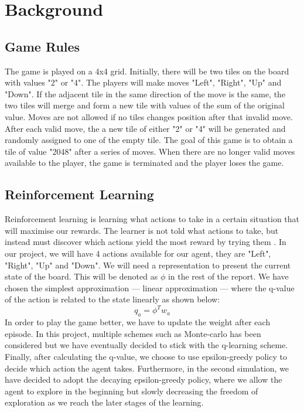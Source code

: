 \section{Background}
\subsection{Game Rules}
The game is played on a 4x4 grid. Initially, there will be two tiles on the board with values "2" or "4".  The players will make moves "Left", "Right", "Up" and "Down". If the adjacent tile in the same direction of the move is the same, the two tiles will merge and form a new tile with values of the sum of the original value. Moves are not allowed if no tiles changes position after that invalid move. After each valid move, the a new tile of either "2" or "4" will be generated and randomly assigned to one of the empty tile. The goal of this game is to obtain a tile of value "2048" after a series of moves. When there are no longer valid moves available to the player, the game is terminated and the player loses the game.

\subsection{Reinforcement Learning}
Reinforcement learning is learning what actions to take in a certain situation  that will maximise our rewards. The learner is not told what actions to take, but instead must discover which actions yield the most reward by trying them \cite{sutton2018reinforcement}.  In our project, we will have 4 actions available for our agent, they are "Left", "Right", "Up" and "Down".  We will need a representation to present the current state of the board. This will be denoted as $\phi$ in the rest of the report. We have chosen the simplest approximation --- linear approximation --- where the q-value of the action  is related to the state linearly as shown below:
\begin{equation*}
q_{a} = \phi ^{T} w_{a}
\end{equation*}
In order to play the game better, we have to update the weight after each episode. In this project, multiple schemes such as Monte-carlo has been considered but we have eventually decided to stick with the q-learning scheme.
\\

Finally, after calculating the q-value, we choose to use epsilon-greedy policy to decide which action the agent takes. Furthermore,  in the second simulation, we have decided to adopt the decaying epsilon-greedy policy, where we allow the agent to explore in the beginning but slowly decreasing the freedom of exploration as we reach the later stages of the learning.